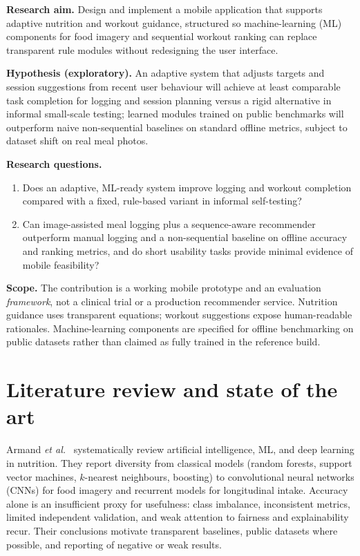 \documentclass[conference]{IEEEtran}
\begin{document}
\textbf{Research aim.} Design and implement a mobile application that supports adaptive nutrition and workout guidance, structured so machine-learning (ML) components for food imagery and sequential workout ranking can replace transparent rule modules without redesigning the user interface.

\textbf{Hypothesis (exploratory).} An adaptive system that adjusts targets and session suggestions from recent user behaviour will achieve at least comparable task completion for logging and session planning versus a rigid alternative in informal small-scale testing; learned modules trained on public benchmarks will outperform naive non-sequential baselines on standard offline metrics, subject to dataset shift on real meal photos.

\textbf{Research questions.}
\begin{enumerate}
  \item Does an adaptive, ML-ready system improve logging and workout completion compared with a fixed, rule-based variant in informal self-testing?
  \item Can image-assisted meal logging plus a sequence-aware recommender outperform manual logging and a non-sequential baseline on offline accuracy and ranking metrics, and do short usability tasks provide minimal evidence of mobile feasibility?
\end{enumerate}

\textbf{Scope.} The contribution is a working mobile prototype and an evaluation \emph{framework}, not a clinical trial or a production recommender service. Nutrition guidance uses transparent equations; workout suggestions expose human-readable rationales. Machine-learning components are specified for offline benchmarking on public datasets rather than claimed as fully trained in the reference build.

\section{Literature review and state of the art}
Armand \emph{et al.}~\cite{armand2024systematic} systematically review artificial intelligence, ML, and deep learning in nutrition. They report diversity from classical models (random forests, support vector machines, $k$-nearest neighbours, boosting) to convolutional neural networks (CNNs) for food imagery and recurrent models for longitudinal intake. Accuracy alone is an insufficient proxy for usefulness: class imbalance, inconsistent metrics, limited independent validation, and weak attention to fairness and explainability recur. Their conclusions motivate transparent baselines, public datasets where possible, and reporting of negative or weak results.
\end{document}
